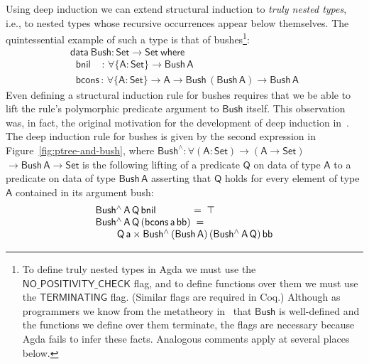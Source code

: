 \documentclass[sigplan,10pt,anonymous,review]{acmart}
\begin{document}
Using deep induction we can extend structural induction to {\em truly
  nested types}, i.e., to nested types whose recursive occurrences
appear below themselves. The quintessential example of such a type is
that of bushes\footnote{To define truly nested types in Agda we must
  use the $\mathsf{NO\_POSITIVITY\_CHECK}$ flag, and to define
  functions over them we must use the $\mathsf{TERMINATING}$ flag.
  {\color{red}(Similar flags are required in Coq.)} Although as
  programmers we know from the metatheory in~\cite{jp19} that
  $\mathsf{Bush}$ is well-defined and the functions we define over
  them terminate, the flags are necessary because Agda fails to infer
  these facts. Analogous comments apply at several places
  below.}\cite{bm98}:
\begin{equation*}\label{eq:bush}
\begin{array}{l}
\mathsf{data\ Bush : Set \to Set\ where}\\
\mathsf{\;\;bnil\,\,\,\,\,\; :\, \forall \{A : Set\} \to Bush\,A}\\
\mathsf{\;\;bcons\, :\, \forall \{A : Set\} \to A \to Bush\,(Bush\,A) \to Bush\,A} 
\end{array}
\end{equation*}
Even defining a structural induction rule for bushes requires that we
be able to lift the rule's polymorphic predicate argument to
$\mathsf{Bush}$ itself. This observation was, in fact, the original
motivation for the development of deep induction in~\cite{jp20}. The
deep induction rule for bushes is given by the second expression in
Figure~\ref{fig:ptree-and-bush}, where $\mathsf{Bush^{\wedge} :
  \forall (A : Set) \to (A \to Set)}$ $\mathsf{\to Bush\,A \to Set}$
is the following lifting of a predicate $\mathsf{Q}$ on data of type
$\mathsf{A}$ to a predicate on data of type $\mathsf{Bush\,A}$
asserting that $\mathsf{Q}$ holds for every element of type
$\mathsf{A}$ contained in its argument bush:
\begin{equation}
\begin{array}{l}
\mathsf{Bush^{\wedge}\,A\,Q\,bnil} \hspace*{0.49in} = \; \mathsf{\top} \\
\mathsf{Bush^{\wedge}\,A\,Q\,(bcons\,a\,bb)} \; = \;\\
\hspace*{0.3in}\mathsf{Q\,a \times Bush^{\wedge}\,(Bush\,A)\,(Bush^{\wedge}\,A\,Q)\,bb} 
\end{array}
\end{equation}
\end{document}
